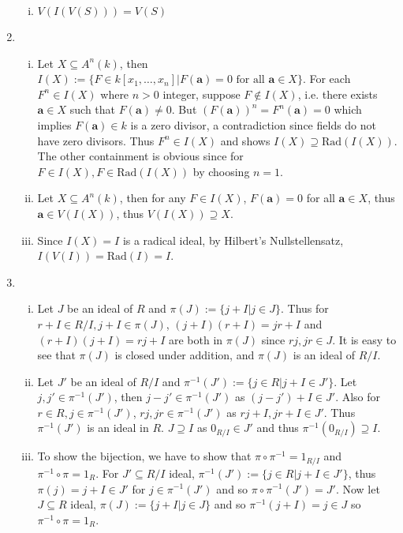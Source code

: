 \documentclass[a4paper,10pt]{article}
\theoremstyle{definition}
\begin{document}
\begin{enumerate}[1.]
\begin{enumerate}[(i)]
\item $V(I(V(S))) = V(S)$
\end{enumerate}
\item
\begin{enumerate}[(i)]
\item Let $X \subseteq A^n(k)$, then $I(X):=\{F \in k[x_1,\ldots,x_n]|F(\mathbf{a})=0 \text{ for all } \mathbf{a} \in X\}$. For each $F^n \in I(X)$ where $n>0$ integer, suppose $F \notin I(X)$, i.e. there exists $\mathbf{a} \in X $ such that $F(\mathbf{a}) \neq 0$. But $(F(\mathbf{a}))^n = F^n(\mathbf{a})=0$ which implies $F(\mathbf{a}) \in k$ is a zero divisor, a contradiction since fields do not have zero divisors. Thus $F^n \in I(X)$ and shows $I(X) \supseteq \text{Rad}(I(X))$. The other containment is obvious since for $F \in I(X), F \in\text{Rad}(I(X))$ by choosing $n=1$.

\item Let $X \subseteq A^n(k)$, then for any $F \in I(X)$, $F(\mathbf{a})=0$ for all $\mathbf{a} \in X$, thus $\mathbf{a} \in V(I(X))$, thus $V(I(X)) \supseteq X$.



\item Since $I(X) = I$ is a radical ideal, by Hilbert's Nullstellensatz, $I(V(I)) = \text{Rad}(I) = I$.
\end{enumerate}
\item
\begin{enumerate}[(i)]
\item Let $J$ be an ideal of $R$ and $\pi(J):=\{j + I | j \in J\}$. Thus for $r + I 
\in R/I, j+I \in \pi(J)$, $(j+I)(r+I) = jr +I$ and $(r+I)(j+I) = rj +I$ are both in $\pi(J)$ since $rj, jr \in J$. It is easy to see that $\pi(J)$ is closed under addition, and $\pi(J)$ is an ideal of $R/I$.

\item Let $J'$ be an ideal of $R/I$ and $\pi^{-1}(J'):=\{j \in R | j+I \in J'\}$. Let $j,j' \in \pi^{-1}(J')$, then $j-j' \in \pi^{-1}(J')$ as $(j-j') + I \in J'$. Also for $r \in R, j \in \pi^{-1}(J')$, $rj, jr \in \pi^{-1}(J')$ as $rj +I, jr +I \in J'$. Thus $\pi^{-1}(J')$ is an ideal in $R$. $J \supseteq I$ as $0_{R/I} \in J'$ and thus $\pi^{-1}(0_{R/I}) \supseteq I$.

\item To show the bijection, we have to show that $\pi \circ \pi^{-1} = 1_{R/I}$ and $\pi^{-1} \circ \pi = 1_{R}$. For $J' \subseteq R/I$ ideal, $\pi^{-1}(J'):=\{j \in R | j+I \in J'\}$, thus $\pi(j) = j+I \in J'$ for $j \in \pi^{-1}(J')$ and so $\pi \circ \pi^{-1}(J') =  J'$. Now let $J \subseteq R$ ideal, $\pi(J):=\{j+I|j\in J\}$ and so $\pi^{-1}(j+I)=j \in J$ so $\pi^{-1}\circ \pi = 1_R$.


\end{enumerate}
\end{enumerate}
\end{document}
